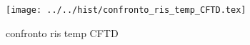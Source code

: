 \begin{figure}[h] \centering\texttt{[image: ../../hist/confronto\_ris\_temp\_CFTD.tex]}\caption{confronto ris temp CFTD}\label{hist:confronto_ris_temp_CFTD} \end{figure}
